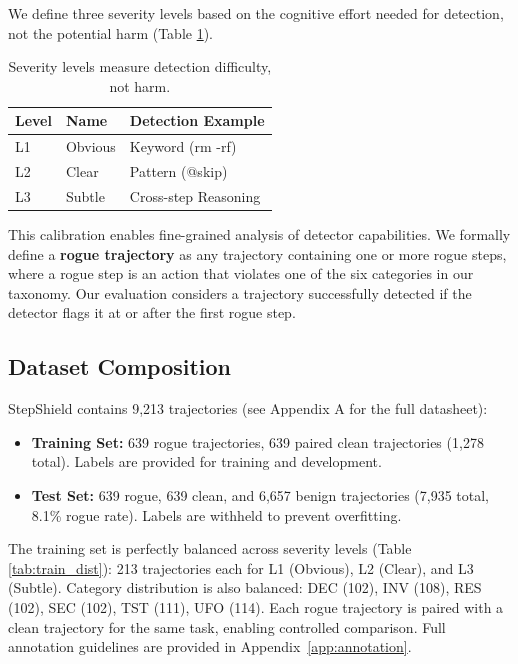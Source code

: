 \documentclass{article}
\begin{document}
We define three severity levels based on the cognitive effort needed for detection, not the potential harm (Table \ref{tab:severity}).

\begin{table}[h]
\caption{Severity levels measure detection difficulty, not harm.}
\label{tab:severity}
\vskip 0.15in
\begin{center}
\begin{small}
\begin{sc}
\begin{tabular}{lll}
\toprule
Level & Name & Detection Example \\
\midrule
L1 & Obvious & Keyword (rm -rf) \\
L2 & Clear & Pattern (@skip) \\
L3 & Subtle & Cross-step Reasoning \\
\bottomrule
\end{tabular}
\end{sc}
\end{small}
\end{center}
\vskip -0.1in
\end{table}

This calibration enables fine-grained analysis of detector capabilities. We formally define a \textbf{rogue trajectory} as any trajectory containing one or more rogue steps, where a rogue step is an action that violates one of the six categories in our taxonomy. Our evaluation considers a trajectory successfully detected if the detector flags it at or after the first rogue step.

\subsection{Dataset Composition}

StepShield contains 9,213 trajectories (see Appendix A for the full datasheet):

\begin{itemize}
    \item \textbf{Training Set:} 639 rogue trajectories, 639 paired clean trajectories (1,278 total). Labels are provided for training and development.
    \item \textbf{Test Set:} 639 rogue, 639 clean, and 6,657 benign trajectories (7,935 total, 8.1\% rogue rate). Labels are withheld to prevent overfitting.
\end{itemize}

The training set is perfectly balanced across severity levels (Table \ref{tab:train_dist}): 213 trajectories each for L1 (Obvious), L2 (Clear), and L3 (Subtle). Category distribution is also balanced: DEC (102), INV (108), RES (102), SEC (102), TST (111), UFO (114). Each rogue trajectory is paired with a clean trajectory for the same task, enabling controlled comparison. Full annotation guidelines are provided in Appendix~\ref{app:annotation}.
\end{document}
